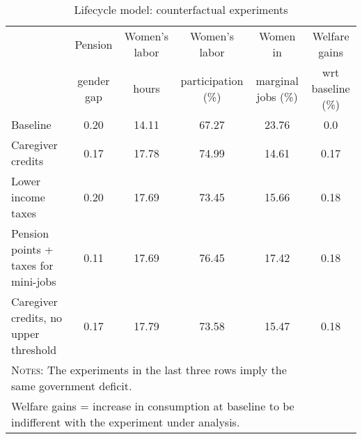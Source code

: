 \begin{table}[htbp]\caption{Lifecycle model: counterfactual experiments}\label{table:experiments}\centering\footnotesize\begin{tabular}{lccccc} \toprule & Pension & Women's labor & Women's labor & Women in &  Welfare gains  \\&gender gap &hours &  participation  (\%) & marginal jobs (\%)  & wrt baseline (\%)  \\\midrule    Baseline                                   &0.20&14.11&67.27&23.76& 0.0\\ Caregiver credits                          &0.17&17.78&74.99&14.61&0.17\\ Lower income taxes                         &0.20&17.69&73.45&15.66&0.18\\ Pension points + taxes for mini-jobs&0.11&17.69&76.45&17.42&0.18\\ Caregiver credits, no upper threshold      &0.17&17.79&73.58&15.47&0.18\\ \bottomrule\multicolumn{5}{l}{\textsc{Notes:} The experiments in the last three rows imply the same government deficit.}\\\multicolumn{5}{l}{Welfare gains = increase in consumption at baseline to be indifferent with the experiment under analysis. }\end{tabular}
      \end{table}